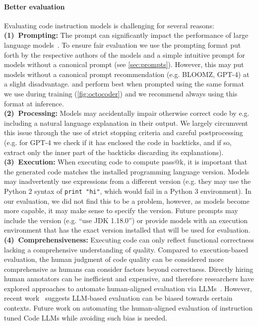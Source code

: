 \paragraph{Better evaluation} Evaluating code instruction models is challenging for several reasons: \textbf{(1)~Prompting:} The prompt can significantly impact the performance of large language models~\citep{brown2020language,zhou2022large,muennighoff2022sgpt,babe2023studenteval}. To ensure fair evaluation we use the prompting format put forth by the respective authors of the models and a simple intuitive prompt for models without a canonical prompt (see \autoref{sec:prompts}). However, this may put models without a canonical prompt recommendation (e.g. BLOOMZ, GPT-4) at a slight disadvantage. \model{} and \modelx{} perform best when prompted using the same format we use during training (\autoref{fig:octocoder}) and we recommend always using this format at inference.\\
\textbf{(2)~Processing:} Models may accidentally impair otherwise correct code by e.g. including a natural language explanation in their output. We largely circumvent this issue through the use of strict stopping criteria and careful postprocessing (e.g. for GPT-4 we check if it has enclosed the code in backticks, and if so, extract only the inner part of the backticks discarding its explanations).\\
\textbf{(3)~Execution:} When executing code to compute pass@k, it is important that the generated code matches the installed programming language version. Models may inadvertently use expressions from a different version (e.g. they may use the Python 2 syntax of \verb|print "hi"|, which would fail in a Python 3 environment). In our evaluation, we did not find this to be a problem, however, as models become more capable, it may make sense to specify the version. Future prompts may include the version (e.g. ``use JDK 1.18.0'') or provide models with an execution environment that has the exact version installed that will be used for evaluation.\\
\textbf{(4)~Comprehensiveness:} Executing code can only reflect functional correctness lacking a comprehensive understanding of quality. Compared to execution-based evaluation, the human judgment of code quality can be considered more comprehensive as humans can consider factors beyond correctness. Directly hiring human annotators can be inefficient and expensive, and therefore researchers have explored approaches to automate human-aligned evaluation via LLMs~\citep{fu2023gptscore, liu2023gpteval, zhuo2023large}. However, recent work~\citep{wang2023far} suggests LLM-based evaluation can be biased towards certain contexts. Future work on automating the human-aligned evaluation of instruction tuned Code LLMs while avoiding such bias is needed.

